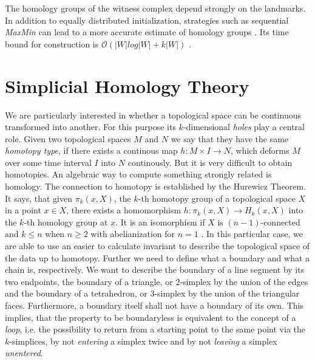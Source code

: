 \documentclass{article}
\begin{document}
The homology groups of the witness complex depend strongly on the landmarks. In addition to equally distributed initialization, strategies such as sequential \textit{MaxMin} can lead to a more accurate estimate of homology groups \cite{de2004topological}. Its time bound for construction is $\mathcal{O}\left(|W|log|W|+k|W|\right)$ \cite{boissonnat2018geometric}.

\section{Simplicial Homology Theory}
\label{sec:simplicialhomology}
We are particularly interested in whether a topological space can be continuous transformed into another. For this purpose its $k$-dimensional \textit{holes} play a central role. Given two topological spaces $M$ and $N$ we say that they have the same \textit{homotopy type}, if there exists a continous map $h: M \times I \rightarrow N$, which deforms $M$ over some time interval $I$ into $N$ continously. But it is very difficult to obtain homotopies. An algebraic way to compute something strongly related is homology. The connection to homotopy is established by the Hurewicz Theorem. It says, that given $\pi_k(x,X)$, the $k$-th homotopy group of a topological space $X$ in a point $x \in X$, there exists a homomorphism $h: \pi_k(x,X) \rightarrow H_k(x,X)$ into the $k$-th homology group at $x$. It is an isomorphism if $X$ is $(n-1)$-connected and $k \leq n$ when $n \geq 2$ with abelianization for $n = 1$ \cite{whitehead2012elements}. In this particular case, we are able to use an easier to calculate invariant to describe the topological space of the data up to homotopy. Further we need to define what a boundary and what a chain is, respectively. We want to describe the boundary of a line segment by its two endpoints, the boundary of a triangle, or $2$-simplex by the union of the edges and the boundary of a tetrahedron, or $3$-simplex by the union of the triangular faces. Furthermore, a boundary itself shall not have a boundary of its own. This implies, that the property to be boundaryless is equivalent to the concept of a \textit{loop}, i.e. the possibility to return from a starting point to the same point via the $k$-simplices, by not \textit{entering} a simplex twice and by not \textit{leaving} a simplex \textit{unentered}.
\end{document}
